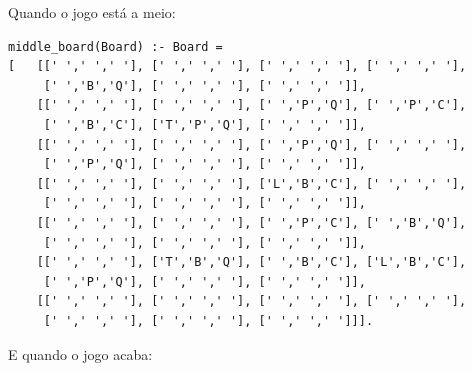 \documentclass[a4paper]{article}
\begin{document}
Quando o jogo está a meio:

\begin{lstlisting}
middle_board(Board) :- Board =
[	[[' ',' ',' '], [' ',' ',' '], [' ',' ',' '], [' ',' ',' '],
	 [' ','B','Q'], [' ',' ',' '], [' ',' ',' ']],
 	[[' ',' ',' '], [' ',' ',' '], [' ','P','Q'], [' ','P','C'],
 	 [' ','B','C'], ['T','P','Q'], [' ',' ',' ']],
	[[' ',' ',' '], [' ',' ',' '], [' ','P','Q'], [' ',' ',' '],
	 [' ','P','Q'], [' ',' ',' '], [' ',' ',' ']],
	[[' ',' ',' '], [' ',' ',' '], ['L','B','C'], [' ',' ',' '],
	 [' ',' ',' '], [' ',' ',' '], [' ',' ',' ']],
 	[[' ',' ',' '], [' ',' ',' '], [' ','P','C'], [' ','B','Q'],
 	 [' ',' ',' '], [' ',' ',' '], [' ',' ',' ']],
 	[[' ',' ',' '], ['T','B','Q'], [' ','B','C'], ['L','B','C'],
 	 [' ','P','Q'], [' ',' ',' '], [' ',' ',' ']],
 	[[' ',' ',' '], [' ',' ',' '], [' ',' ',' '], [' ',' ',' '],
 	 [' ',' ',' '], [' ',' ',' '], [' ',' ',' ']]].
\end{lstlisting}

E quando o jogo acaba:
\end{document}
